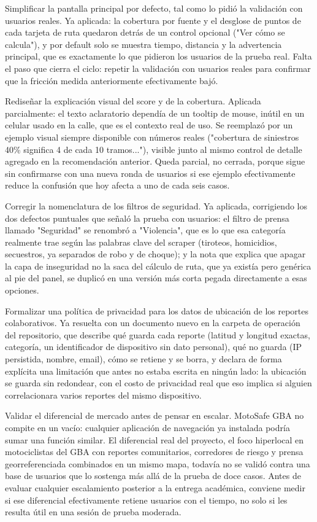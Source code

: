 Simplificar la pantalla principal por defecto, tal como lo pidió la
validación con usuarios reales. Ya aplicada: la cobertura por fuente y
el desglose de puntos de cada tarjeta de ruta quedaron detrás de un
control opcional ("Ver cómo se calcula"), y por default solo se muestra
tiempo, distancia y la advertencia principal, que es exactamente lo que
pidieron los usuarios de la prueba real. Falta el paso que cierra el
ciclo: repetir la validación con usuarios reales para confirmar que la
fricción medida anteriormente efectivamente bajó.

Rediseñar la explicación visual del score y de la cobertura. Aplicada
parcialmente: el texto aclaratorio dependía de un tooltip de mouse,
inútil en un celular usado en la calle, que es el contexto real de uso.
Se reemplazó por un ejemplo visual siempre disponible con números reales
("cobertura de siniestros 40\% significa 4 de cada 10 tramos..."),
visible junto al mismo control de detalle agregado en la recomendación
anterior. Queda parcial, no cerrada, porque sigue sin confirmarse con
una nueva ronda de usuarios si ese ejemplo efectivamente reduce la
confusión que hoy afecta a uno de cada seis casos.

Corregir la nomenclatura de los filtros de seguridad. Ya aplicada,
corrigiendo los dos defectos puntuales que señaló la prueba con
usuarios: el filtro de prensa llamado "Seguridad" se renombró a
"Violencia", que es lo que esa categoría realmente trae según las
palabras clave del scraper (tiroteos, homicidios, secuestros, ya
separados de robo y de choque); y la nota que explica que apagar la capa
de inseguridad no la saca del cálculo de ruta, que ya existía pero
genérica al pie del panel, se duplicó en una versión más corta pegada
directamente a esas opciones.

Formalizar una política de privacidad para los datos de ubicación de los
reportes colaborativos. Ya resuelta con un documento nuevo en la carpeta
de operación del repositorio, que describe qué guarda cada reporte
(latitud y longitud exactas, categoría, un identificador de dispositivo
sin dato personal), qué no guarda (IP persistida, nombre, email), cómo
se retiene y se borra, y declara de forma explícita una limitación que
antes no estaba escrita en ningún lado: la ubicación se guarda sin
redondear, con el costo de privacidad real que eso implica si alguien
correlacionara varios reportes del mismo dispositivo.

Validar el diferencial de mercado antes de pensar en escalar. MotoSafe
GBA no compite en un vacío: cualquier aplicación de navegación ya
instalada podría sumar una función similar. El diferencial real del
proyecto, el foco hiperlocal en motociclistas del GBA con reportes
comunitarios, corredores de riesgo y prensa georreferenciada combinados
en un mismo mapa, todavía no se validó contra una base de usuarios que
lo sostenga más allá de la prueba de doce casos. Antes de evaluar
cualquier escalamiento posterior a la entrega académica, conviene medir
si ese diferencial efectivamente retiene usuarios con el tiempo, no solo
si les resulta útil en una sesión de prueba moderada.

